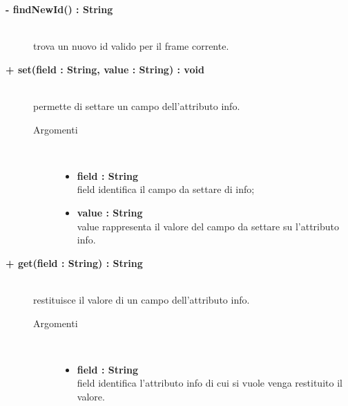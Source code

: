 \begin{description}
	\begin{description}
		\item[\textbf{\color{blue}- findNewId() : String			}] \hfill \\
			trova un nuovo id valido per il frame corrente.

\end{description}

	\begin{description}
		\item[\textbf{\color{blue}+ set(field : String, value : String) : void			}] \hfill \\
			permette di settare un campo dell'attributo info.
			
		\begin{description}
			\item[Argomenti] \hfill \\
				\begin{itemize}
				
					\item \textbf{field : String			} \hfill \\
					field identifica il campo da settare di info;
					\item \textbf{value : String			} \hfill \\
					value rappresenta il valore del campo da settare su l'attributo info.
				\end{itemize}
		\end{description}

\end{description}

\begin{description}
		\item[\textbf{\color{blue}+ get(field : String) : String			}] \hfill \\
			restituisce il valore di un campo dell'attributo info.
			
		\begin{description}
			\item[Argomenti] \hfill \\
				\begin{itemize}
				
					\item \textbf{field : String			} \hfill \\
					field identifica l'attributo info di cui si vuole venga restituito il valore.
				\end{itemize}
		\end{description}


\end{description}
\end{description}
